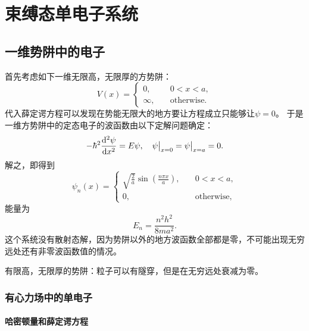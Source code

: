 \chapter{束缚态单电子系统}

\section{一维势阱中的电子}

首先考虑如下一维无限高，无限厚的方势阱：
\begin{equation}
    V(x) = \begin{cases}
        0, \quad &0 < x < a, \\
        \infty, \quad &\text{otherwise}.
    \end{cases}
\end{equation}
代入薛定谔方程可以发现在势能无限大的地方要让方程成立只能够让$\psi=0$。
于是一维方势阱中的定态电子的波函数由以下定解问题确定：
\[
    - \hbar^2 \dv[2]{\psi}{x} = E \psi, \quad \psi\big|_{x=0} = \psi\big|_{x=a} = 0.
\]
解之，即得到
\begin{equation}
    \psi_n(x) = \begin{cases}
        \sqrt{\frac{2}{a}} \sin(\frac{n \pi x}{a}), \quad &0 < x < a, \\
        0, \quad &\text{otherwise},
    \end{cases}
\end{equation}
能量为
\begin{equation}
    E_n = \frac{n^2 h^2}{8 m a^2}.
\end{equation}
这个系统没有散射态解，因为势阱以外的地方波函数全部都是零，不可能出现无穷远处还有非零波函数值的情况。

有限高，无限厚的势阱：粒子可以有隧穿，但是在无穷远处衰减为零。

\subsection{有心力场中的单电子}

\subsubsection{哈密顿量和薛定谔方程}

